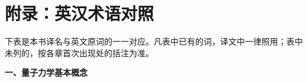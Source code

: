 \chapter*{附录：英汉术语对照}
\begingroup
\small
下表是本书译名与英文原词的一一对应。凡表中已有的词，译文中一律照用；表中未列的，按各章首次出现处的括注为准。

\filbreak
\vspace{0.9em}
\noindent\textbf{一、量子力学基本概念}\par\nobreak\vspace{0.35em}
